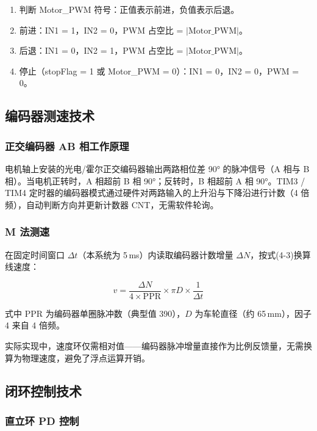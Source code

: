\documentclass[12pt,a4paper,UTF8]{ctexrep}
\begin{document}
\begin{enumerate}
  \item 判断 Motor\_PWM 符号：正值表示前进，负值表示后退。
  \item 前进：IN1 = 1，IN2 = 0，PWM 占空比 = $|\text{Motor\_PWM}|$。
  \item 后退：IN1 = 0，IN2 = 1，PWM 占空比 = $|\text{Motor\_PWM}|$。
  \item 停止（stopFlag = 1 或 Motor\_PWM = 0）：IN1 = 0，IN2 = 0，PWM = 0。
\end{enumerate}

\subsection{编码器测速技术}

\subsubsection{正交编码器 AB 相工作原理}

电机轴上安装的光电/霍尔正交编码器输出两路相位差 90° 的脉冲信号（A 相与 B 相）。当电机正转时，A 相超前 B 相 90°；反转时，B 相超前 A 相 90°。TIM3 / TIM4 定时器的编码器模式通过硬件对两路输入的上升沿与下降沿进行计数（4 倍频），自动判断方向并更新计数器 CNT，无需软件轮询。

\subsubsection{M 法测速}

在固定时间窗口 $\Delta t$（本系统为 5\,ms）内读取编码器计数增量 $\Delta N$，按式(4-3)换算线速度：

\begin{equation}
  v = \frac{\Delta N}{4 \times \text{PPR}} \times \pi D \times \frac{1}{\Delta t}
\end{equation}

式中 PPR 为编码器单圈脉冲数（典型值 390），$D$ 为车轮直径（约 65\,mm），因子 4 来自 4 倍频。

实际实现中，速度环仅需相对值——编码器脉冲增量直接作为比例反馈量，无需换算为物理速度，避免了浮点运算开销。

\subsection{闭环控制技术}

\subsubsection{直立环 PD 控制}
\end{document}
